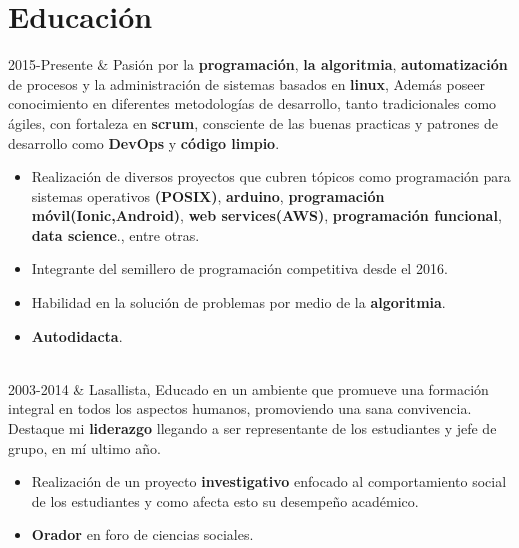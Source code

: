 \documentclass[
    changecolor={111, 156, 45}, 
]{cv-roald}
\newcommand{\RomanNumeralCaps}[1]
    {\MakeUppercase{\romannumeral #1}}
\begin{document}
\section*{Educación}
\begin{tabularcv}

2015-Presente   &   
                \newline Pasión por la  \textbf{programación}, \textbf{la algoritmia}, \textbf{automatización} de procesos y la administración de sistemas basados en \textbf{linux}, Además poseer conocimiento en diferentes metodologías de desarrollo, tanto tradicionales como ágiles,  con fortaleza en \textbf{scrum}, consciente de las buenas practicas y patrones de desarrollo como \textbf{DevOps} y \textbf{código limpio}.
                \begin{itemize}
				  \item Realización de diversos proyectos que cubren tópicos como programación para sistemas operativos \textbf{(POSIX)}, \textbf{arduino}, \textbf{programación móvil(Ionic,Android)}, \textbf{web services(AWS)}, \textbf{programación funcional}, \textbf{data science}., entre otras.
				  \item Integrante del semillero de programación competitiva desde el 2016.
				  \item  Habilidad en la solución de problemas por medio de la \textbf{algoritmia}.
				  \item \textbf{Autodidacta}.
                \end{itemize}
                \\
                
2003-2014   &     
                \newline Lasallista, Educado en un ambiente que promueve una formación integral en todos los aspectos humanos, promoviendo una sana convivencia. Destaque mi \textbf{liderazgo} llegando a ser representante de los estudiantes y jefe de grupo, en mí ultimo año. 
                \begin{itemize}
				  \item Realización de un proyecto \textbf{investigativo} enfocado al comportamiento social de los estudiantes y como afecta esto su desempeño académico.
                  \item \textbf{Orador} en \RomanNumeralCaps{2} foro de ciencias sociales.
                \end{itemize} 

                
\end{tabularcv}
\end{document}
